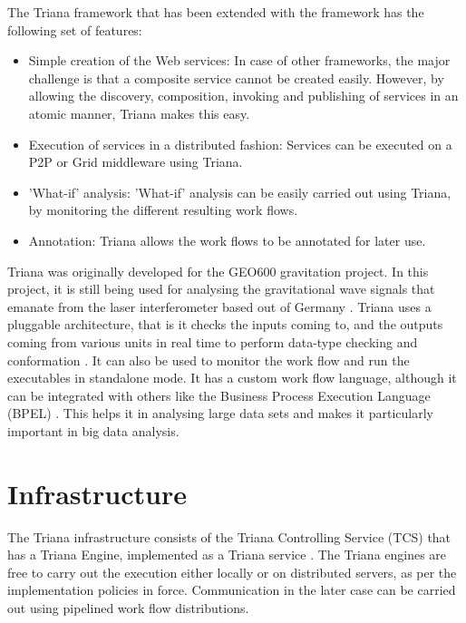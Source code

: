 \documentclass[9pt,twocolumn,twoside]{styles/osajnl}
\begin{document}
The Triana framework that has been extended with the framework has the 
following set of features: 

\begin{itemize} 

\item Simple creation of the Web services: In case of other frameworks, 
the major challenge is that a composite service cannot be created 
easily. However, by allowing the discovery, composition, invoking and 
publishing of services in an atomic manner, Triana makes this easy. 

\item Execution of services in a distributed fashion: Services can be 
executed on a P2P or Grid middleware using Triana. 

\item 'What-if' analysis: 'What-if' analysis can be easily carried out 
using Triana, by monitoring the different resulting work flows. 

\item Annotation: Triana allows the work flows to be annotated for later 
use. 

\end{itemize}

Triana was originally developed for the GEO600
gravitation project.  In this project, it is still being used for
analysing the gravitational wave signals that emanate from the laser
interferometer based out of Germany \cite{TrianaGEO600}.  Triana uses 
a pluggable architecture, that is it checks the inputs
coming to, and the outputs coming from various units in real time to
perform data-type checking and conformation \cite{TrianaDocumentation2}.  
It can also be used to monitor the work flow and run the executables in standalone mode.
  It has a custom work flow language, although it can
be integrated with others like the Business Process Execution Language
(BPEL) \cite{RMBDP-Book}.  This helps it in analysing large data sets and makes it
particularly important in big data analysis.

\section{Infrastructure}

The Triana infrastructure consists of the
Triana Controlling Service (TCS) that has a Triana Engine, implemented
as a Triana service \cite{TrianaDocumentation2}.  The Triana engines 
are free to carry out the execution either locally or on distributed servers,
as per the implementation policies in force.  Communication in the later case can
be carried out using pipelined work flow distributions.
\end{document}

